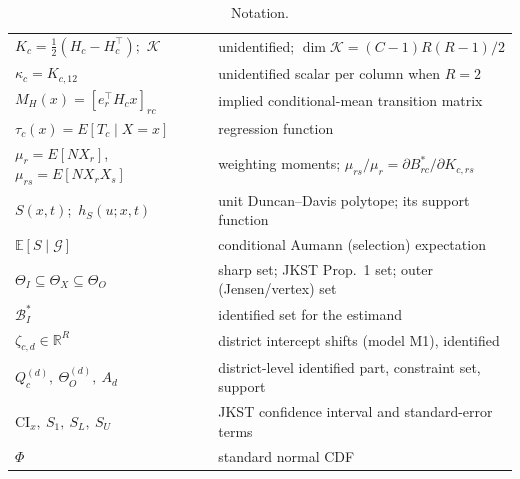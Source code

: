 \begin{table}[ht]
\begin{tabular}{@{}ll@{}}
$K_c=\tfrac12(H_c-H_c^\top)$;\ $\mathcal K$ & unidentified; $\dim\mathcal K=(C-1)R(R-1)/2$ \\
$\kappa_c=K_{c,12}$ & unidentified scalar per column when $R=2$ \\
$M_H(x)=[e_r^\top H_cx]_{rc}$ & implied conditional-mean transition matrix \\
$\tau_c(x)=E[T_c\mid X=x]$ & regression function \\
$\mu_r=E[NX_r]$,\ $\mu_{rs}=E[NX_rX_s]$ & weighting moments; $\mu_{rs}/\mu_r=\partial B^*_{rc}/\partial K_{c,rs}$ \\
$S(x,t)$;\ $h_S(u;x,t)$ & unit Duncan--Davis polytope; its support function \\
$\mathbb E[S\mid\mathcal G]$ & conditional Aumann (selection) expectation \\
$\Theta_I\subseteq\Theta_X\subseteq\Theta_O$ & sharp set; JKST Prop.~1 set; outer (Jensen/vertex) set \\
$\mathcal B^*_I$ & identified set for the estimand \\
$\zeta_{c,d}\in\mathbb R^R$ & district intercept shifts (model M1), identified \\
$Q^{(d)}_c,\ \Theta^{(d)}_O,\ A_d$ & district-level identified part, constraint set, support \\
$\mathrm{CI}_x,\ S_1,\ S_L,\ S_U$ & JKST confidence interval and standard-error terms \\
$\Phi$ & standard normal CDF \\
\bottomrule
\end{tabular}
\caption{Notation.}
\end{table}
